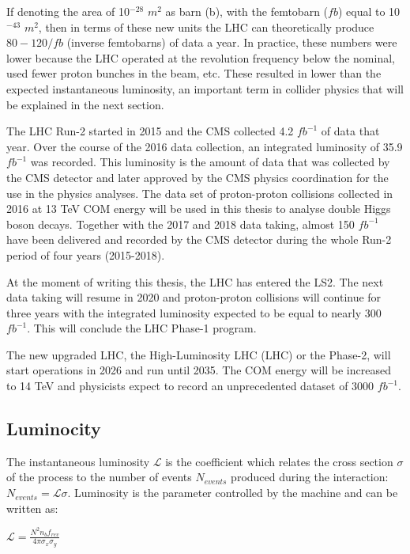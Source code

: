 \begin{normalsize}
If denoting the area of 10$^{-28}$ $m^2$ as barn (b), with the femtobarn ($fb$) equal to 10$^{-43}$ $m^2$, then in terms of these new units the LHC can theoretically produce $80-120/fb$ (inverse femtobarns) of data a year. In practice, these numbers were lower because the LHC operated at the revolution frequency below the nominal, used fewer proton bunches in the beam, etc.  These resulted in lower than the expected instantaneous luminosity, an important term in collider physics that will be explained in the next section.


The LHC Run-2 started in 2015 and the CMS collected 4.2 $fb^{-1}$ of data that year. Over the course of the 2016 data collection, an integrated luminosity of 35.9 $fb^{-1}$ was recorded. This luminosity is the amount of data that was collected by the CMS detector and later approved by the CMS physics coordination for the use in the physics analyses. The data set of proton-proton collisions collected in 2016 at 13 TeV COM energy will be used in this thesis to analyse double Higgs boson decays. Together with the 2017 and 2018 data taking, almost 150 $fb^{-1}$ have been delivered and recorded by the CMS detector during the whole Run-2 period of four years (2015-2018). 


At the moment of writing this thesis, the LHC has entered the LS2. The next data taking will resume in 2020 and proton-proton collisions will continue for three years with the integrated luminosity expected to be equal to nearly 300 $fb^{-1}$. This will conclude the LHC Phase-1 program. 




The new upgraded LHC, the High-Luminosity LHC (LHC) or the Phase-2, will start operations in 2026 and run until 2035. The COM energy will be increased to 14 TeV and physicists expect to record an unprecedented dataset of 3000 $fb^{-1}$. 

\subsection{Luminocity}


The instantaneous luminosity $ \mathcal{L} $ is the coefficient which relates the cross section $\sigma$ of the process to the number of events $N_{events}$ produced during the interaction: $N_{events} = \mathcal{L}  \sigma$. Luminosity is the parameter controlled by the machine and can be written as:

$ \mathcal{L} =\frac{N^2 n_b f_{rev}}{4\pi \sigma_x \sigma_y}$


\end{normalsize}
